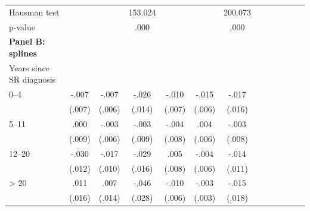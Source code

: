 \documentclass[12pt,english]{article}
\begin{document}
\begin{table}[p]
\begin{center}
\begin{adjustbox}{max width=0.8\linewidth}
\begin{threeparttable}
{\begin{tabular}{l*{6}{S
								S}}
						
						Hausman test    &                  &                  &  153.024         &                  &                  &  200.073         \\
						\hspace*{10mm} p-value         &                  &                  &     .000         &                  &                  &     .000         \\
						\addlinespace
						\textbf{Panel B: splines}&&&&&&\\
						Years since SR diagnosis  &&&&&&\\
						\hspace*{10mm}0--4&    -.007         &    -.007         &    -.026\sym{*}  &    -.010         &    -.015\sym{**} &    -.017         \\
						&   (.007)         &   (.006)         &   (.014)         &   (.007)         &   (.006)         &   (.016)         \\
						\hspace*{10mm}5--11&     .000         &    -.003         &    -.003         &    -.004         &     .004         &    -.003         \\
						&   (.009)         &   (.006)         &   (.009)         &   (.008)         &   (.006)         &   (.008)         \\
						\hspace*{10mm}12--20&  -.030\sym{**} &    -.017\sym{*}  &    -.029\sym{*}  &     .005         &    -.004         &    -.014         \\
						&   (.012)         &   (.010)         &   (.016)         &   (.008)         &   (.006)         &   (.011)         \\
						\hspace*{10mm}> 20&     .011         &     .007         &    -.046\sym{*}  &    -.010\sym{*}  &    -.003         &    -.015         \\
						&   (.016)         &   (.014)         &   (.028)         &   (.006)         &   (.003)         &   (.018)         \\


\end{tabular}}
\end{threeparttable}
\end{adjustbox}
\end{center}
\end{table}
\end{document}
